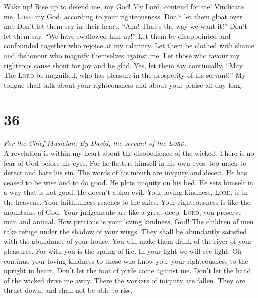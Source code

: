  Wake up! Rise up to defend me, my God! My Lord, contend
for me!  Vindicate me, \textsc{Lord} my God, according to
your righteousness. Don't let them gloat over me.  Don't
let them say in their heart, ``Aha! That's the way we want it!'' Don't
let them say, ``We have swallowed him up!''  Let them be
disappointed and confounded together who rejoice at my calamity. Let
them be clothed with shame and dishonour who magnify themselves against
me.  Let those who favour my righteous cause shout for
joy and be glad. Yes, let them say continually, ``May The \textsc{Lord}
be magnified, who has pleasure in the prosperity of his servant!''
 My tongue shall talk about your righteousness and about
your praise all day long.

\hypertarget{section-35}{%
\section{36}\label{section-35}}

\emph{For the Chief Musician. By David, the servant of the
\textsc{Lord}.}\\
 A revelation is within my heart about the disobedience of
the wicked: There is no fear of God before his eyes.  For
he flatters himself in his own eyes, too much to detect and hate his
sin.  The words of his mouth are iniquity and deceit. He
has ceased to be wise and to do good.  He plots iniquity
on his bed. He sets himself in a way that is not good. He doesn't abhor
evil.  Your loving kindness, \textsc{Lord}, is in the
heavens. Your faithfulness reaches to the skies.  Your
righteousness is like the mountains of God. Your judgements are like a
great deep. \textsc{Lord}, you preserve man and animal. 
How precious is your loving kindness, God! The children of men take
refuge under the shadow of your wings.  They shall be
abundantly satisfied with the abundance of your house. You will make
them drink of the river of your pleasures.  For with you
is the spring of life. In your light we will see light. 
Oh continue your loving kindness to those who know you, your
righteousness to the upright in heart.  Don't let the
foot of pride come against me. Don't let the hand of the wicked drive me
away.  There the workers of iniquity are fallen. They are
thrust down, and shall not be able to rise.

